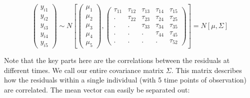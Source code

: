 \documentclass[
  letterpaper,
  DIV=11,
  numbers=noendperiod]{scrreprt}
\begin{document}
\[\begin{pmatrix}y_{i1}\\
y_{i2}\\
y_{i3}\\
y_{i4}\\
y_{i5}
\end{pmatrix} \sim N\left[\left(\begin{array}{c}
\mu_1\\
\mu_2\\
\mu_3\\
\mu_4\\
\mu_5
\end{array}\right),\left(\begin{array}{ccccc}
\tau_{11} & \tau_{12} & \tau_{13} & \tau_{14} & \tau_{15}\\
. & \tau_{22} & \tau_{23}& \tau_{24} & \tau_{25}\\
. & . & \tau_{33}& \tau_{34} & \tau_{35}\\
. & . & . & \tau_{44} & \tau_{45}\\
. & . & . & . & \tau_{52}
\end{array}\right)\right] = N[ \mu, \Sigma ]\]

Note that the key parts here are the correlations between the residuals
at different times. We call our entire covariance matrix \(\Sigma\).
This matrix describes how the residuals within a single individual (with
5 time points of observation) are correlated. The mean vector can easily
be separated out:
\end{document}
